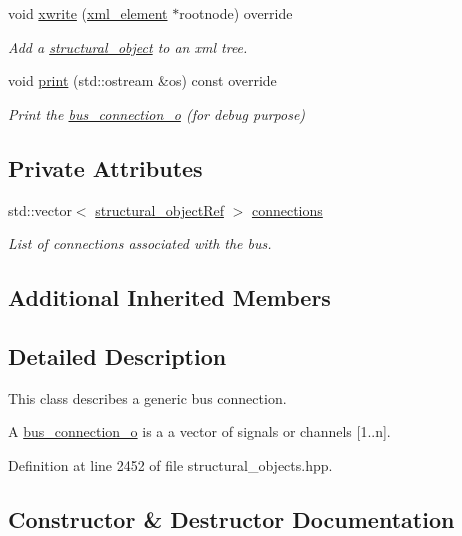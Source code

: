 \begin{DoxyCompactItemize}
void \hyperlink{classbus__connection__o_acb507e284b971944f09b6b26264dc0cf}{xwrite} (\hyperlink{classxml__element}{xml\+\_\+element} $\ast$rootnode) override
\begin{DoxyCompactList}\small\item\em Add a \hyperlink{classstructural__object}{structural\+\_\+object} to an xml tree. \end{DoxyCompactList}\item 
void \hyperlink{classbus__connection__o_ae96b465789da7122ed409f31bc43421a}{print} (std\+::ostream \&os) const override
\begin{DoxyCompactList}\small\item\em Print the \hyperlink{classbus__connection__o}{bus\+\_\+connection\+\_\+o} (for debug purpose) \end{DoxyCompactList}\end{DoxyCompactItemize}
\subsection*{Private Attributes}
\begin{DoxyCompactItemize}
\item 
std\+::vector$<$ \hyperlink{structural__objects_8hpp_a8ea5f8cc50ab8f4c31e2751074ff60b2}{structural\+\_\+object\+Ref} $>$ \hyperlink{classbus__connection__o_a72b5be48a9e1b6383fe7283d87e99aa7}{connections}
\begin{DoxyCompactList}\small\item\em List of connections associated with the bus. \end{DoxyCompactList}\end{DoxyCompactItemize}
\subsection*{Additional Inherited Members}


\subsection{Detailed Description}
This class describes a generic bus connection. 

A \hyperlink{classbus__connection__o}{bus\+\_\+connection\+\_\+o} is a a vector of signals or channels \mbox{[}1..n\mbox{]}. 

Definition at line 2452 of file structural\+\_\+objects.\+hpp.



\subsection{Constructor \& Destructor Documentation}
\mbox{\label{classbus__connection__o_a485c5badad3181d1cd72456260af1a61}} 
